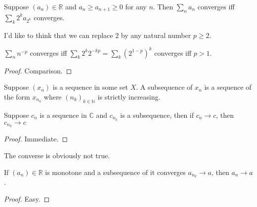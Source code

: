 \begin{proposition}
    Suppose $(a_n)\in\mathbb R$ and $a_n\ge a_{n+1}\ge 0$ for any $n$.
    Then $\sum_na_n$ converges iff $\sum_{k}2^ka_{2^k}$ converges.
\end{proposition}
I'd like to think that we can replace $2$ by any natural number $p\ge 2$.
\begin{example}
    $\sum_nn^{-p}$ converges iff $\sum_k2^k2^{-kp}=\sum_k(2^{1-p})^k$ converges iff $p>1$.
\end{example}
\begin{proof}
    Comparison.
\end{proof}
\begin{definition}
    Suppose $(x_n)$ is a sequence in some set $X$.
    A subsequence of $x_n$ is a sequence of the form $x_{n_k}$ where $(n_k)_{k\in\mathbb N}$ is strictly increasing.
\end{definition}
\begin{lemma}
    Suppose $c_n$ is a sequence in $\mathbb C$ and $c_{n_k}$ is a subsequence, then if $c_n\to c$, then $c_{n_k}\to c$
\end{lemma}
\begin{proof}
    Immediate.
\end{proof}
The converse is obviously not true.
\begin{lemma}
    If $(a_n)\in\mathbb R$ is monotone and a subsequence of it converges $a_{n_k}\to a$, then $a_n\to a$.
\end{lemma}
\begin{proof}
    Easy.
\end{proof}
